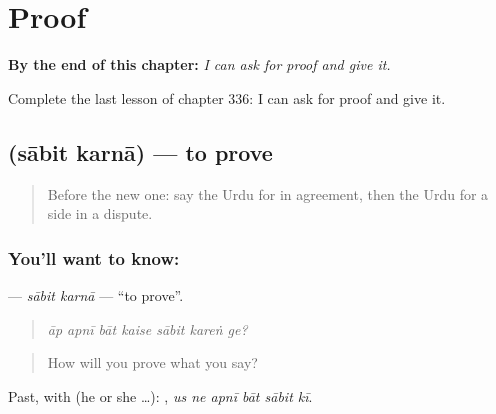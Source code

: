 
\chapter{Proof}
\label{ch:ur-proof}

\begin{chapteropening}
\textbf{By the end of this chapter:} \emph{I can ask for proof and give it.}

Complete the last lesson of chapter 336: I can ask for proof and give it.
\end{chapteropening}

\section[\texorpdfstring{\ur{ثابت} \ur{کرنا} (sābit karnā)}{ثابت کرنا (sābit karnā)}]{  (sābit karnā) — to prove}

\label{lesson:UR-C336-sabit-karna}



\begin{quote}
Before the new one: say the Urdu for in agreement, then the Urdu for a side in a dispute.
\end{quote}

\subsection*{You'll want to know:  }
\textbf{ } — \emph{sābit karnā} — \textquotedblleft{}to prove\textquotedblright{}.

\begin{quote}
      
\end{quote}

\begin{quote}
\emph{āp apnī bāt kaise sābit kareṅ ge?}
\end{quote}

\begin{quote}
How will you prove what you say?
\end{quote}

Past, with  (he or she …):      , \emph{us ne apnī bāt sābit kī}.

